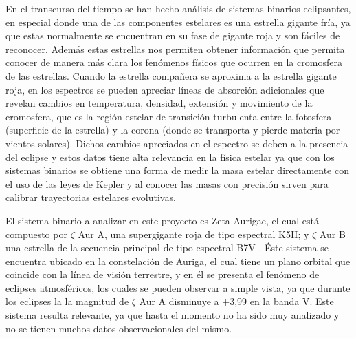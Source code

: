 \documentclass[11pt]{article}
\begin{document}
\noindent En el transcurso del tiempo se han hecho análisis de sistemas binarios eclipsantes, en especial donde una de las componentes estelares es una estrella gigante fría, ya que estas normalmente se encuentran en su fase de gigante roja y son fáciles de reconocer. Además estas estrellas nos permiten obtener información que permita conocer de manera más clara los fenómenos físicos que ocurren en la cromosfera de las estrellas. Cuando la estrella compañera se aproxima a la estrella gigante roja, en los espectros se pueden apreciar líneas de absorción adicionales que revelan cambios en temperatura, densidad, extensión y movimiento de la cromosfera, que es la región estelar de transición turbulenta entre la fotosfera (superficie de la estrella) y la corona (donde se transporta y pierde materia por vientos solares). Dichos cambios apreciados en el espectro se deben a la presencia del eclipse y estos datos tiene alta relevancia en la física estelar ya que con los sistemas binarios se obtiene una forma de medir la masa estelar directamente con el uso de las leyes de Kepler y al conocer las masas con precisión sirven para calibrar trayectorias estelares evolutivas.

\noindent El sistema binario a analizar en este proyecto es Zeta Aurigae, el cual está compuesto por $\zeta$ Aur A, una supergigante roja de tipo espectral K5II; y $\zeta$ Aur B una estrella de la secuencia principal de tipo espectral B7V \cite{shenavrin2011vizier}. Éste sistema se encuentra ubicado en la constelación de Auriga, el cual tiene un plano orbital que coincide con la línea de visión terrestre, y en él se presenta el fenómeno de eclipses atmosféricos, los cuales se pueden observar a simple vista, ya que durante los eclipses la la magnitud de $\zeta$ Aur A disminuye a +3,99 en la banda V. Este sistema resulta relevante, ya que hasta el momento no ha sido muy analizado y no se tienen muchos datos observacionales del mismo.
\vspace{2mm}
\end{document}
